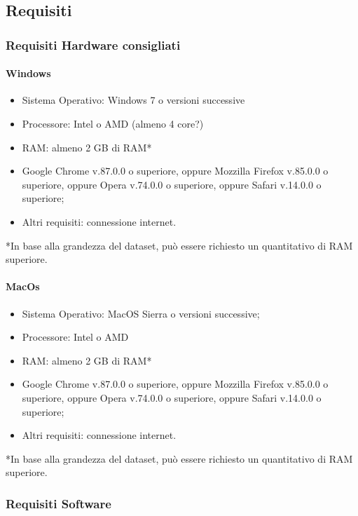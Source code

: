 \documentclass[../manuale_utente.tex]{subfiles}
\begin{document}
\subsection{Requisiti}
    \label{sec:requisiti}
\subsubsection{Requisiti Hardware consigliati}
    \label{subsub:req_h}

\paragraph{Windows}
    \label{par:Windows_req}

\begin{itemize}
    \item Sistema Operativo: Windows 7 o versioni successive
    \item Processore: Intel o AMD (almeno 4 core?)
    \item RAM: almeno 2 GB di RAM*
    \item Google Chrome v.87.0.0 o superiore, oppure Mozzilla Firefox v.85.0.0 o superiore, oppure Opera v.74.0.0 o superiore, oppure Safari v.14.0.0 o superiore;
    \item Altri requisiti: connessione internet.
\end{itemize}
*In base alla grandezza del dataset, può essere richiesto un quantitativo di RAM superiore.

\paragraph{MacOs}
    \label{par:mac_req}

\begin{itemize}
    \item Sistema Operativo: MacOS Sierra o versioni successive;
    \item Processore: Intel o AMD
    \item RAM: almeno 2 GB di RAM*
    \item Google Chrome v.87.0.0 o superiore, oppure Mozzilla Firefox v.85.0.0 o superiore, oppure Opera v.74.0.0 o superiore, oppure Safari v.14.0.0 o superiore;
    \item Altri requisiti: connessione internet.
\end{itemize}
*In base alla grandezza del dataset, può essere richiesto un quantitativo di RAM superiore.

\subsubsection{Requisiti Software}
    \label{subsub:req_s}
\end{document}
